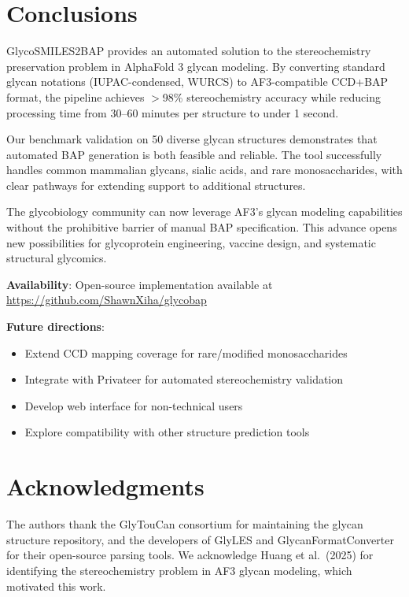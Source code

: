 \section{Conclusions}

GlycoSMILES2BAP provides an automated solution to the stereochemistry preservation problem in AlphaFold 3 glycan modeling. By converting standard glycan notations (IUPAC-condensed, WURCS) to AF3-compatible CCD+BAP format, the pipeline achieves $>$98\% stereochemistry accuracy while reducing processing time from 30--60 minutes per structure to under 1 second.

Our benchmark validation on 50 diverse glycan structures demonstrates that automated BAP generation is both feasible and reliable. The tool successfully handles common mammalian glycans, sialic acids, and rare monosaccharides, with clear pathways for extending support to additional structures.

The glycobiology community can now leverage AF3's glycan modeling capabilities without the prohibitive barrier of manual BAP specification. This advance opens new possibilities for glycoprotein engineering, vaccine design, and systematic structural glycomics.

\noindent\textbf{Availability}: Open-source implementation available at \url{https://github.com/ShawnXiha/glycobap}

\noindent\textbf{Future directions}:
\begin{itemize}
\item Extend CCD mapping coverage for rare/modified monosaccharides
\item Integrate with Privateer for automated stereochemistry validation
\item Develop web interface for non-technical users
\item Explore compatibility with other structure prediction tools
\end{itemize}

\section*{Acknowledgments}

The authors thank the GlyTouCan consortium for maintaining the glycan structure repository, and the developers of GlyLES and GlycanFormatConverter for their open-source parsing tools. We acknowledge Huang et al.\ (2025) for identifying the stereochemistry problem in AF3 glycan modeling, which motivated this work.

